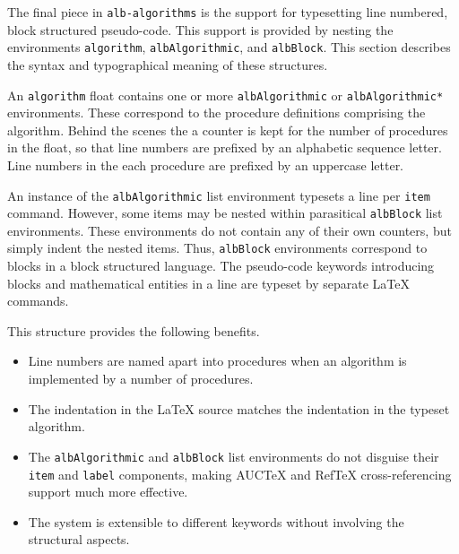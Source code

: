 \documentclass[11pt,a4paper,oneside,titlepage]{alb-corp}
\begin{document}
The final piece in \texttt{alb-algorithms} is the support for
typesetting line numbered, block structured pseudo-code.  This support
is provided by nesting the environments \texttt{algorithm},
\texttt{albAlgorithmic}, and \texttt{albBlock}.  This section describes
the syntax and typographical meaning of these structures.

An \texttt{algorithm} float contains one or more \texttt{albAlgorithmic}
or \texttt{albAlgorithmic*} environments.  These correspond to the
procedure definitions comprising the algorithm.  Behind the scenes the a
counter is kept for the number of procedures in the float, so that line
numbers are prefixed by an alphabetic sequence letter.  Line numbers in
the each procedure are prefixed by an uppercase letter.

An instance of the \texttt{albAlgorithmic} list environment typesets a
line per \texttt{item} command.  However, some items may be nested
within parasitical \texttt{albBlock} list environments.  These
environments do not contain any of their own counters, but simply indent
the nested items.  Thus, \texttt{albBlock} environments correspond to
blocks in a block structured language.  The pseudo-code keywords
introducing blocks and mathematical entities in a line are typeset by
separate \LaTeX{} commands.

This structure provides the following benefits.
\begin{itemize}
\item Line numbers are named apart into procedures when an algorithm is
  implemented by a number of procedures.
\item The indentation in the \LaTeX{} source matches the indentation in
  the typeset algorithm.
\item The \texttt{albAlgorithmic} and \texttt{albBlock} list environments
  do not disguise their \texttt{item} and \texttt{label} components,
  making AUCTeX and RefTeX cross-referencing support much more
  effective.
\item The system is extensible to different keywords without involving
  the structural aspects.
\end{itemize}
\end{document}
